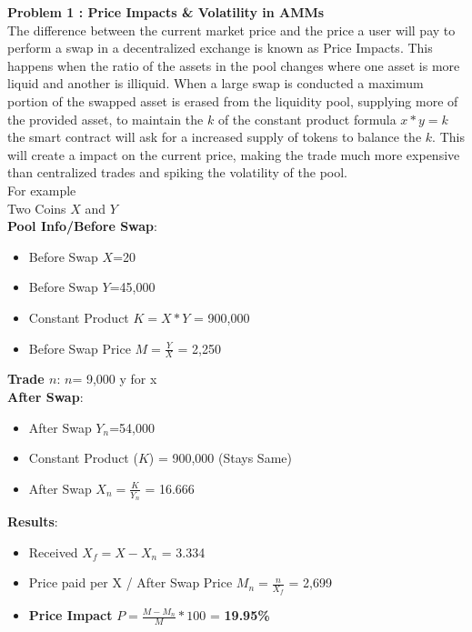 \documentclass[10pt]{article}
\begin{document}
\textbf{Problem 1 : Price Impacts \& Volatility in AMMs}\\

The difference between the current market price and the price a user will pay to perform a swap in a decentralized exchange is known as Price Impacts. This happens when the ratio of the assets in the pool changes where one asset is more liquid and another is illiquid. When a large swap is conducted a maximum portion of the swapped asset is erased from the liquidity pool, supplying more of the provided asset, to maintain the $k$ of the constant product formula $x*y=k$ the smart contract will ask for a increased supply of tokens to balance the $k$. This will create a impact on the current price, making the trade much more expensive than centralized trades and spiking the volatility of the pool.\\



For example\\

Two Coins $X$ and $Y$\\


\textbf{Pool Info/Before Swap}:
\begin{itemize}[leftmargin=+0.2in]
\item Before Swap $X$=20
\item Before Swap $Y$=45,000
\item Constant Product $K=X*Y$ = 900,000 
\item Before Swap Price $M=\frac{Y}{X}$ = 2,250 
\end{itemize}

\textbf{Trade $n$}: $n$= 9,000 y for x\\

\textbf{After Swap}:
\begin{itemize}[leftmargin=+0.2in]
\item After Swap $Y_n$=54,000 
\item Constant Product ($K$) = 900,000 (Stays Same)
\item After Swap $X_n=\frac{K}{Y_n}$ = 16.666  
\end{itemize}
\textbf{Results}:
\begin{itemize}[leftmargin=+0.2in]
\item Received $X_f={{X}-{X_n}}$ = 3.334 
\item Price paid per X / After Swap Price $M_n={\frac{n}{X_f}}$  = 2,699  
\item \textbf{Price Impact} $P={\frac{M - M_n}{M}*100}$ = \textbf{19.95\% }
\end{itemize}
\end{document}
